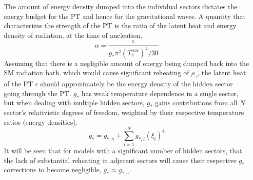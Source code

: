 \documentclass[nofootinbib,twocolumn,preprintnumbers]{revtex4-1}
\begin{document}
The amount of energy density dumped into the individual sectors dictates the energy budget for the PT and hence for the gravitational waves.  A quantity that characterizes the strength of the PT is the ratio of the latent heat and energy density of radiation, at the time of nucleation, 
\begin{equation}
\alpha = \frac{\epsilon}{g_{*} \pi^2 (T^{nuc}_{\gamma})^4/30}
\end{equation}
 Assuming that there is a negligible amount of energy being dumped back into the SM radiation bath, which would cause significant reheating of $\rho_{\gamma}$, the latent heat of the PT $\epsilon$ should  approximately be the energy density of the hidden sector going through the PT. $g_{*}$ has weak temperature dependence in a single sector, but when dealing with multiple hidden sectors, $g_{*}$ gains contributions from all $N$ sector's relativistic degrees of freedom, weighted by their respective temperature ratios (energy densities).
\begin{equation}
g_{*} = g_{*,\gamma} + \sum_{i = 1}^{N} g_{*,i} (\xi_{i})^4
\end{equation}
It will be seen that for models with a significant number of hidden sectors, that the lack of substantial reheating in adjecent sectors will cause their respective $g_{*}$ corrections to become negligible, $g_{*} \approx g_{*,\gamma}$.
\end{document}
